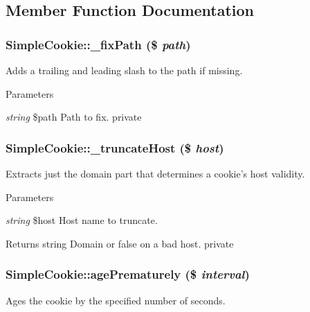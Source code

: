 \subsection{Member Function Documentation}
\hypertarget{class_simple_cookie_a873874781143075ad0874c076b658bff}{
\subsubsection[{\_\-fixPath}]{\setlength{\rightskip}{0pt plus 5cm}SimpleCookie::\_\-fixPath (\$ {\em path})}}
\label{class_simple_cookie_a873874781143075ad0874c076b658bff}
Adds a trailing and leading slash to the path if missing. 
\begin{DoxyParams}{Parameters}
\item[{\em string}]\$path Path to fix.  private \end{DoxyParams}
\hypertarget{class_simple_cookie_aaaccae16ef83f62122331398d11673b3}{
\subsubsection[{\_\-truncateHost}]{\setlength{\rightskip}{0pt plus 5cm}SimpleCookie::\_\-truncateHost (\$ {\em host})}}
\label{class_simple_cookie_aaaccae16ef83f62122331398d11673b3}
Extracts just the domain part that determines a cookie's host validity. 
\begin{DoxyParams}{Parameters}
\item[{\em string}]\$host Host name to truncate. \end{DoxyParams}
\begin{DoxyReturn}{Returns}
string Domain or false on a bad host.  private 
\end{DoxyReturn}
\hypertarget{class_simple_cookie_a1259e0fd03d9d4e10fabe075721daeb2}{
\subsubsection[{agePrematurely}]{\setlength{\rightskip}{0pt plus 5cm}SimpleCookie::agePrematurely (\$ {\em interval})}}
\label{class_simple_cookie_a1259e0fd03d9d4e10fabe075721daeb2}
Ages the cookie by the specified number of seconds. 
